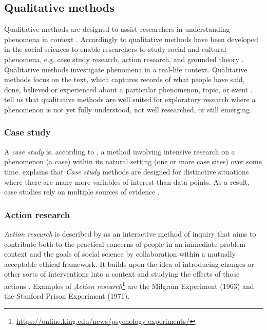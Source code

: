 \subsection{Qualitative methods}
\label{sub:qualitativemethods}
Qualitative methods are designed to assist researchers in understanding phenomena in context \parencite[p.~84]{Recker2013}. Accordingly to \textcite[p.~84]{Recker2013} qualitative methods have been developed in the social sciences to enable researchers to study social and cultural phenomena, e.g. case study research, action research, and grounded theory \parencite[p.~85]{Recker2013}. Qualitative methods investigate phenomena in a real-life context. Qualitative methods focus on the text, which captures records of what people have said, done, believed or experienced about a particular phenomenon, topic, or event \parencite[p.~85]{Recker2013}. \textcite[p.~84]{Recker2013} tell us that qualitative methods are well suited for exploratory research where a phenomenon is not yet fully understood, not well researched, or still emerging.

\subsubsection{Case study}
\label{subsub:case study}
A \textit{case study} is, according to \textcite[p.~92]{Recker2013}, a method involving intensive research on a phenomenon (a case) within its natural setting (one or more case sites) over some time. \textcite[p.~92]{Recker2013} explains that \textit{Case study} methods are designed for distinctive situations where there are many more variables of interest than data points. As a result, case studies rely on multiple sources of evidence \parencite[p.~92]{Recker2013}.

\subsubsection{Action research}
\label{subsub:actionresearch}
\textit{Action research} is described by \textcite[p.~96]{Recker2013} as an interactive method of inquiry that aims to contribute both to the practical concerns of people in an immediate problem context and the goals of social science by collaboration within a mutually acceptable ethical framework. It builds upon the idea of introducing changes or other sorts of interventions into a context and studying the effects of those actions \parencite[p.~96]{Recker2013}. Examples of \textit{Action research}\footnote{\url{https://online.king.edu/news/psychology-experiments/}} are the Milgram Experiment (1963) and the Stanford Prison Experiment (1971).

